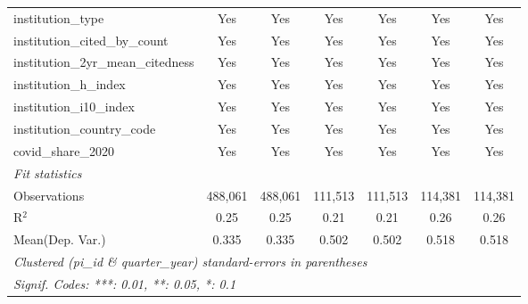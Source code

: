 \begin{tabular}{lcccccc}
   institution\_type                                           & Yes            & Yes            & Yes           & Yes           & Yes            & Yes\\  
   institution\_cited\_by\_count                               & Yes            & Yes            & Yes           & Yes           & Yes            & Yes\\  
   institution\_2yr\_mean\_citedness                           & Yes            & Yes            & Yes           & Yes           & Yes            & Yes\\  
   institution\_h\_index                                       & Yes            & Yes            & Yes           & Yes           & Yes            & Yes\\  
   institution\_i10\_index                                     & Yes            & Yes            & Yes           & Yes           & Yes            & Yes\\  
   institution\_country\_code                                  & Yes            & Yes            & Yes           & Yes           & Yes            & Yes\\  
   covid\_share\_2020                                          & Yes            & Yes            & Yes           & Yes           & Yes            & Yes\\  
   \midrule
   \emph{Fit statistics}\\
   Observations                                                & 488,061        & 488,061        & 111,513       & 111,513       & 114,381        & 114,381\\  
   R$^2$                                                       & 0.25           & 0.25           & 0.21          & 0.21          & 0.26           & 0.26\\  
Mean(Dep. Var.) & 0.335 & 0.335 & 0.502 & 0.502 & 0.518 & 0.518 \\
   \midrule \midrule
   \multicolumn{7}{l}{\emph{Clustered (pi\_id \& quarter\_year) standard-errors in parentheses}}\\
   \multicolumn{7}{l}{\emph{Signif. Codes: ***: 0.01, **: 0.05, *: 0.1}}\\
\end{tabular}
\par\endgroup

